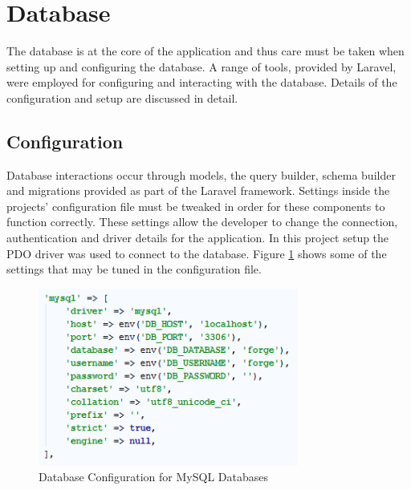 \section{Database}
The database is at the core of the application and thus care must be taken when setting up and configuring the database. A range of tools, provided by Laravel, were employed for configuring and interacting with the database. Details of the configuration and setup are discussed in detail.

\subsection{Configuration}
Database interactions occur through models, the query builder, schema builder and migrations provided as part of the Laravel framework. Settings inside the projects' configuration file must be tweaked in order for these components to function correctly. These settings allow the developer to change the connection, authentication and driver details for the application. In this project setup the PDO driver was used to connect to the database. Figure \ref{fig:DatabaseConfig} shows some of the settings that may be tuned in the configuration file.

\begin{figure}[H]
	\centering
	\includegraphics[height=2.3in]{Images/Implementation/MySQLConfig}
	\caption{Database Configuration for MySQL Databases} \label{fig:DatabaseConfig}
\end{figure}

